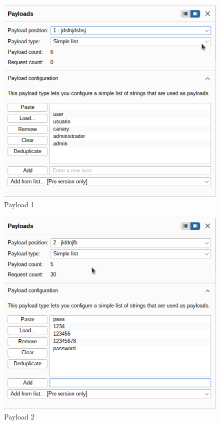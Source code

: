 \documentclass[letter,12pt]{article}
\begin{document}
\begin{figure}
    \centering
    \includegraphics[width=1\linewidth]{identificaryobtenercamposburp/Captura desde 2025-10-01 23-25-19.png}
    \caption{Payload 1}
    \label{fig:payload1}
\end{figure}
\begin{figure}
    \centering
    \includegraphics[width=1\linewidth]{identificaryobtenercamposburp/Captura desde 2025-10-01 23-25-58.png}
    \caption{Payload 2}
    \label{fig:payload2}
\end{figure}
\end{document}
